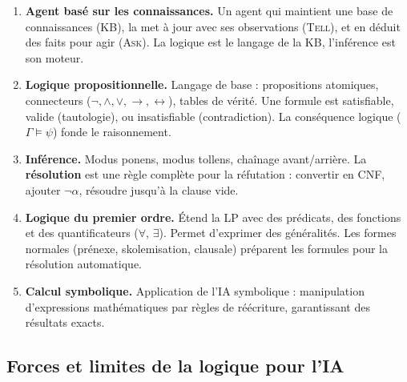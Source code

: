 \documentclass[11pt,a4paper]{article}
\begin{document}
\begin{retenirbox}
\begin{enumerate}
    \item \textbf{Agent basé sur les connaissances.} Un agent qui maintient une base de connaissances (KB), la met à jour avec ses observations (\textsc{Tell}), et en déduit des faits pour agir (\textsc{Ask}). La logique est le langage de la KB, l'inférence est son moteur.

    \item \textbf{Logique propositionnelle.} Langage de base : propositions atomiques, connecteurs ($\neg, \land, \lor, \rightarrow, \leftrightarrow$), tables de vérité. Une formule est satisfiable, valide (tautologie), ou insatisfiable (contradiction). La conséquence logique ($\Gamma \models \psi$) fonde le raisonnement.

    \item \textbf{Inférence.} Modus ponens, modus tollens, chaînage avant/arrière. La \textbf{résolution} est une règle complète pour la réfutation : convertir en CNF, ajouter $\neg\alpha$, résoudre jusqu'à la clause vide.

    \item \textbf{Logique du premier ordre.} Étend la LP avec des prédicats, des fonctions et des quantificateurs ($\forall$, $\exists$). Permet d'exprimer des généralités. Les formes normales (prénexe, skolemisation, clausale) préparent les formules pour la résolution automatique.

    \item \textbf{Calcul symbolique.} Application de l'IA symbolique : manipulation d'expressions mathématiques par règles de réécriture, garantissant des résultats exacts.
\end{enumerate}
\end{retenirbox}

\subsection{Forces et limites de la logique pour l'IA}
\end{document}
